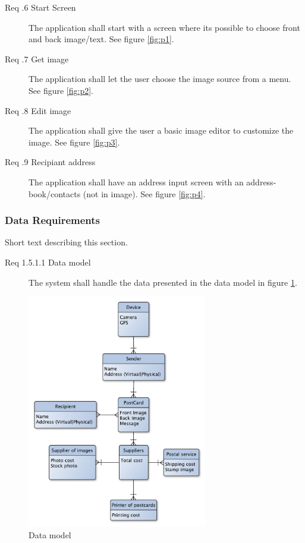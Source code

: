 \documentclass[10pt,a4paper]{article}
\newcommand{\tsss}{\thesubsubsection}
\begin{document}
\begin {description}
\item[Req \tsss.6 Start Screen] The application shall start with a screen where its possible to choose front and back image/text. See figure \ref{fig:p1}.
\item[Req \tsss.7 Get image] The application shall let the user choose the image source from a menu. See figure \ref{fig:p2}.
\item[Req \tsss.8 Edit image]The application shall give the user a basic image editor to customize the image. See figure \ref{fig:p3}.
\item[Req \tsss.9 Recipiant address] The application shall have an address input screen with an address-book/contacts (not in image). See figure \ref{fig:p4}.
\end{description}

\subsubsection{Data Requirements}
Short text describing this section.

\begin {description}
\item[Req 1.5.1.1 Data model] The system shall handle the data presented in the data model in figure \ref{fig:datamodel}.
\end{description}

\begin{figure}[h!]
\centering
\includegraphics[width=0.7\textwidth]{Data_figures/DataModel.pdf}
\caption{Data model}
\label{fig:datamodel}
\end{figure}
\FloatBarrier
\end{document}
